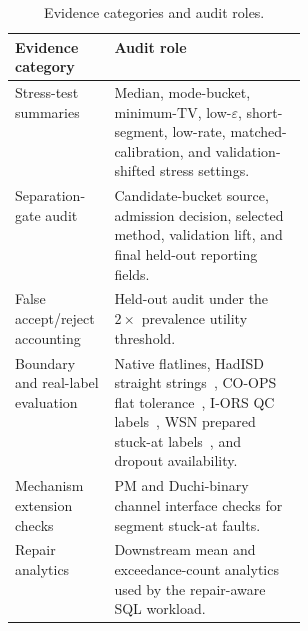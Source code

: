 \documentclass[conference]{IEEEtran}
\newcommand{\TV}{\mathrm{TV}}
\begin{document}
\begin{table}[t]
\centering
\caption{Compact operator routing decision.}
\label{tab:router_map}
\scriptsize
\setlength{\tabcolsep}{2pt}
\renewcommand{\arraystretch}{0.9}
\end{table}

\begin{table}[t]
\centering
\caption{Evidence categories and audit roles.}
\label{tab:evidence_audit_roles}
\scriptsize
\setlength{\tabcolsep}{2pt}
\renewcommand{\arraystretch}{0.9}
\begin{tabularx}{\columnwidth}{p{0.34\linewidth}Y}
\toprule
Evidence category & Audit role \\
\midrule
Stress-test summaries & Median, mode-bucket, minimum-\(\TV\), low-\(\varepsilon\), short-segment, low-rate, matched-calibration, and validation-shifted stress settings. \\
Separation-gate audit & Candidate-bucket source, admission decision, selected method, validation lift, and final held-out reporting fields. \\
False accept/reject accounting & Held-out audit under the \(2\times\) prevalence utility threshold. \\
Boundary and real-label evaluation & Native flatlines, HadISD straight strings~\cite{dunn2016hadisd}, CO-OPS flat tolerance~\cite{noaa_coops_verified_erddap,noaa_coops_qc_requirements}, I-ORS QC labels~\cite{jeong2025iorsslh}, WSN prepared stuck-at labels~\cite{zidi2018wsnsvm}, and dropout availability. \\
Mechanism extension checks & PM and Duchi-binary channel interface checks for segment stuck-at faults. \\
Repair analytics & Downstream mean and exceedance-count analytics used by the repair-aware SQL workload. \\
\bottomrule
\end{tabularx}
\end{table}
\end{document}
